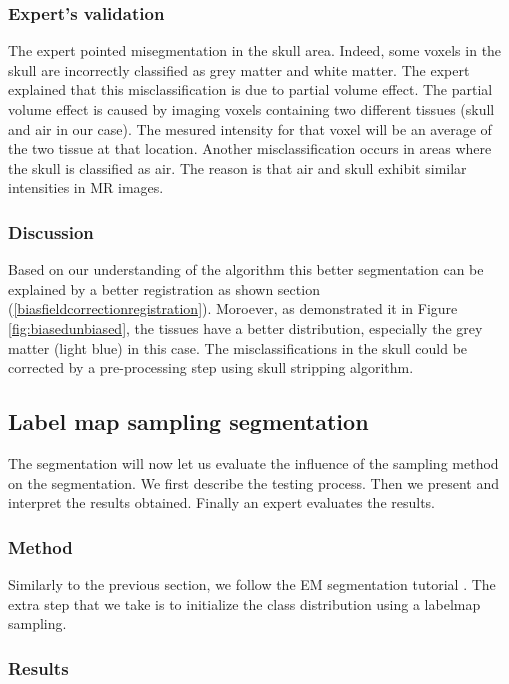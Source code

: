 %
%

\subsubsection{Expert's validation}
The expert pointed  misegmentation in the skull area. Indeed, some voxels in the skull are incorrectly classified as grey matter and white matter. The expert explained that this misclassification is due to partial volume effect. The partial volume effect is caused by imaging voxels containing two different tissues (skull and air in our case). The mesured intensity for that voxel will be an average of the two tissue at that location. Another misclassification occurs in areas where the skull is classified as air. The reason is that air and skull exhibit similar intensities in MR images.

\subsubsection{Discussion}
Based on our understanding of the algorithm this better segmentation can be explained by a better registration as shown section (\ref{biasfieldcorrectionregistration}). Moroever, as demonstrated it in Figure \ref{fig:biasedunbiased}, the tissues have a better distribution, especially the grey matter (light blue) in this case. The misclassifications in the skull could be corrected by a pre-processing step using skull stripping algorithm.
%
%
\subsection{Label map sampling segmentation}
The segmentation  will now let us evaluate the influence of the sampling method on the segmentation. We first describe the testing process. Then we present and interpret the results obtained. Finally an expert evaluates the results.
%
\subsubsection{Method}
Similarly to the previous section, we follow the EM segmentation tutorial . The extra step that we take is to initialize the class distribution using a labelmap sampling.
%
\subsubsection{Results}


